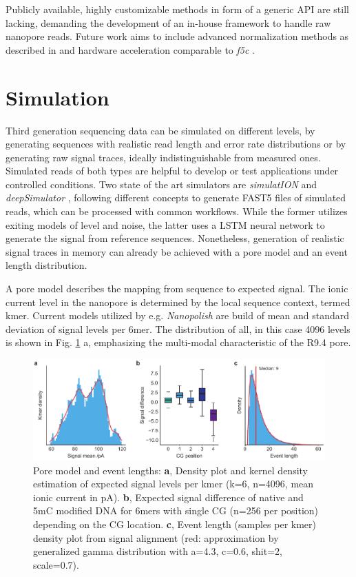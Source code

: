 Publicly available, highly customizable methods in form of a generic API are still lacking, demanding the development of an in-house framework to handle raw nanopore reads. Future work aims to include advanced normalization methods as described in \cite{Boza2017} and hardware acceleration comparable to \textit{f5c} \cite{Gamaarachchi2020}.




\section{Simulation}
\label{sec:signal:simulation}

Third generation sequencing data can be simulated on different levels, by generating sequences with realistic read length and error rate distributions or by generating raw signal traces, ideally indistinguishable from measured ones. Simulated reads of both types are helpful to develop or test applications under controlled conditions. Two state of the art simulators are \textit{simulatION} \cite{Rohrandt2018} and \textit{deepSimulator} \cite{Li2020}, following different concepts to generate FAST5 files of simulated reads, which can be processed with common workflows. While the former utilizes exiting models of level and noise, the latter uses a LSTM neural network to generate the signal from reference sequences. Nonetheless, generation of realistic signal traces in memory can already be achieved with a pore model and an event length distribution.

A pore model describes the mapping from sequence to expected signal. The ionic current level in the nanopore is determined by the local sequence context, termed kmer. Current models utilized by e.g. \textit{Nanopolish} are build of mean and standard deviation of signal levels per 6mer. The distribution of all, in this case 4096 levels is shown in Fig. \ref{fig:signal:pm} a, emphasizing the multi-modal characteristic of the R9.4 pore.

\begin{figure}[h]
	\centering
	\includegraphics[width=1.0\textwidth]{figures/signal/pm.pdf}
	\captionsetup{format=plain}
	\caption[Pore model and event length]{Pore model and event lengths: \textbf{a}, Density plot and kernel density estimation of expected signal levels per kmer (k=6, n=4096, mean ionic current in pA). \textbf{b}, Expected signal difference of native and 5mC modified DNA for 6mers with single CG (n=256 per position) depending on the CG location. \textbf{c}, Event length (samples per kmer) density plot from signal alignment (red: approximation by generalized gamma distribution with a=4.3, c=0.6, shit=2, scale=0.7).}
	\label{fig:signal:pm}
\end{figure}

